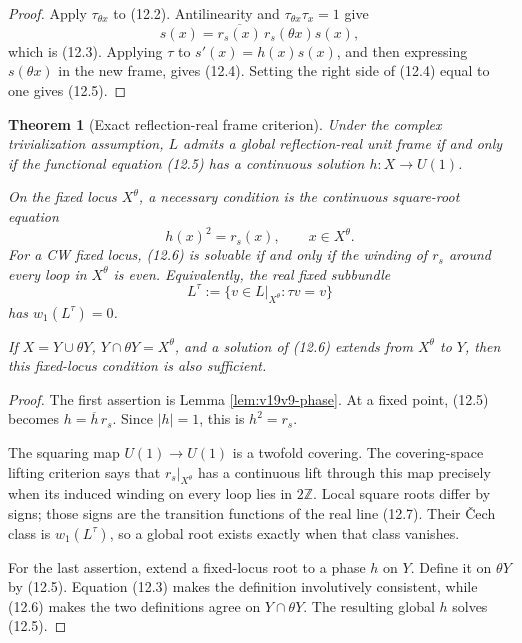 \documentclass[11pt]{article}
\newtheorem{theorem}{Theorem}[section]
\theoremstyle{remark}
\begin{document}
\begin{proof}
Apply \(\tau_{\theta x}\) to (12.2).  Antilinearity and
\(\tau_{\theta x}\tau_x=1\) give
\[
 s(x)=\overline{r_s(x)}\,r_s(\theta x)s(x),
\]
which is (12.3).  Applying \(\tau\) to
\(s'(x)=h(x)s(x)\), and then expressing \(s(\theta x)\) in the new frame,
gives (12.4).  Setting the right side of (12.4) equal to one gives (12.5).
\end{proof}

\begin{theorem}[Exact reflection-real frame criterion]
\label{thm:v19v9-real-frame}
Under the complex trivialization assumption, \(L\) admits a global
reflection-real unit frame if and only if the functional equation (12.5)
has a continuous solution \(h:X\to U(1)\).

On the fixed locus \(X^\theta\), a necessary condition is the continuous
square-root equation
\[
 h(x)^2=r_s(x),\qquad x\in X^\theta.                            \tag{12.6}
\]
For a CW fixed locus, (12.6) is solvable if and only if the winding of
\(r_s\) around every loop in \(X^\theta\) is even.  Equivalently, the real
fixed subbundle
\[
 L^\tau:=\{v\in L|_{X^\theta}:\tau v=v\}                       \tag{12.7}
\]
has \(w_1(L^\tau)=0\).

If \(X=Y\cup\theta Y\), \(Y\cap\theta Y=X^\theta\), and a solution of
(12.6) extends from \(X^\theta\) to \(Y\), then this fixed-locus condition
is also sufficient.
\end{theorem}

\begin{proof}
The first assertion is Lemma \ref{lem:v19v9-phase}.  At a fixed point,
(12.5) becomes \(h=\overline h\,r_s\).  Since \(|h|=1\), this is
\(h^2=r_s\).

The squaring map \(U(1)\to U(1)\) is a twofold covering.  The covering-space
lifting criterion says that \(r_s|_{X^\theta}\) has a continuous lift
through this map precisely when its induced winding on every loop lies in
\(2\mathbb Z\).  Local square roots differ by signs; those signs are the
transition functions of the real line (12.7).  Their Čech class is
\(w_1(L^\tau)\), so a global root exists exactly when that class vanishes.

For the last assertion, extend a fixed-locus root to a phase \(h\) on
\(Y\).  Define it on \(\theta Y\) by (12.5).  Equation (12.3) makes the
definition involutively consistent, while (12.6) makes the two definitions
agree on \(Y\cap\theta Y\).  The resulting global \(h\) solves (12.5).
\end{proof}
\end{document}

